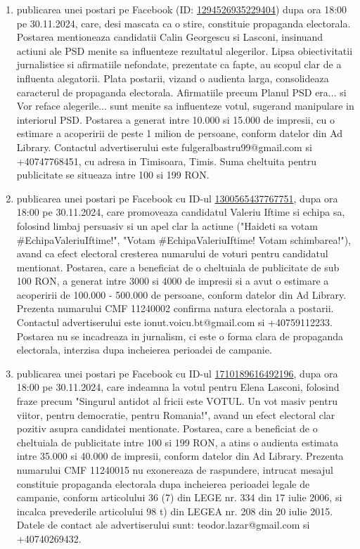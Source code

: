 \documentclass[a4paper,12pt]{article}
\begin{document}
\begin{enumerate}[leftmargin=*, label=\arabic*.)]
    \item publicarea unei postari pe Facebook (ID: \href{https://www.facebook.com/ads/library/?id=1294526935229404}{1294526935229404}) dupa ora 18:00 pe 30.11.2024, care, desi mascata ca o stire, constituie propaganda electorala. Postarea mentioneaza candidatii Calin Georgescu si Lasconi, insinuand actiuni ale PSD menite sa influenteze rezultatul alegerilor. Lipsa obiectivitatii jurnalistice si afirmatiile nefondate, prezentate ca fapte, au scopul clar de a influenta alegatorii.  Plata postarii, vizand o audienta larga, consolideaza caracterul de propaganda electorala.  Afirmatiile precum Planul PSD era... si Vor reface alegerile... sunt menite sa influenteze votul, sugerand manipulare in interiorul PSD.  Postarea a generat intre 10.000 si 15.000 de impresii, cu o estimare a acoperirii de peste 1 milion de persoane, conform datelor din Ad Library.  Contactul advertiserului este fulgeralbastru99@gmail.com si +40747768451, cu adresa in Timisoara, Timis. Suma cheltuita pentru publicitate se situeaza intre 100 si 199 RON.
    \item publicarea unei postari pe Facebook cu ID-ul \href{https://www.facebook.com/ads/library/?id=1300565437767751}{1300565437767751}, dupa ora 18:00 pe 30.11.2024, care promoveaza candidatul Valeriu Iftime si echipa sa, folosind limbaj persuasiv si un apel clar la actiune ("Haideti sa votam \#EchipaValeriuIftime!", "Votam \#EchipaValeriuIftime! Votam schimbarea!"), avand ca efect electoral cresterea numarului de voturi pentru candidatul mentionat. Postarea, care a beneficiat de o cheltuiala de publicitate de sub 100 RON, a generat intre 3000 si 4000 de impresii si a avut o estimare a acoperirii de 100.000 - 500.000 de persoane, conform datelor din Ad Library.  Prezenta numarului CMF 11240002 confirma natura electorala a postarii.  Contactul advertiserului este ionut.voicu.bt@gmail.com si +40759112233.  Postarea nu se incadreaza in jurnalism, ci este o forma clara de propaganda electorala, interzisa dupa incheierea perioadei de campanie.
    \item publicarea unei postari pe Facebook cu ID-ul \href{https://www.facebook.com/ads/library/?id=1710189616492196}{1710189616492196}, dupa ora 18:00 pe 30.11.2024, care indeamna la votul pentru Elena Lasconi, folosind fraze precum "Singurul antidot al fricii este VOTUL. Un vot masiv pentru viitor, pentru democratie, pentru Romania!",  avand un efect electoral clar pozitiv asupra candidatei mentionate. Postarea, care a beneficiat de o cheltuiala de publicitate intre 100 si 199 RON, a atins o audienta estimata intre 35.000 si 40.000 de impresii, conform datelor din Ad Library.  Prezenta numarului CMF 11240015 nu exonereaza de raspundere, intrucat mesajul constituie propaganda electorala dupa incheierea perioadei legale de campanie, conform articolului 36 (7) din LEGE nr. 334 din 17 iulie 2006, si incalca prevederile articolului 98 t) din LEGEA nr. 208 din 20 iulie 2015.  Datele de contact ale advertiserului sunt: teodor.lazar@gmail.com si +40740269432.

\end{enumerate}
\end{document}
